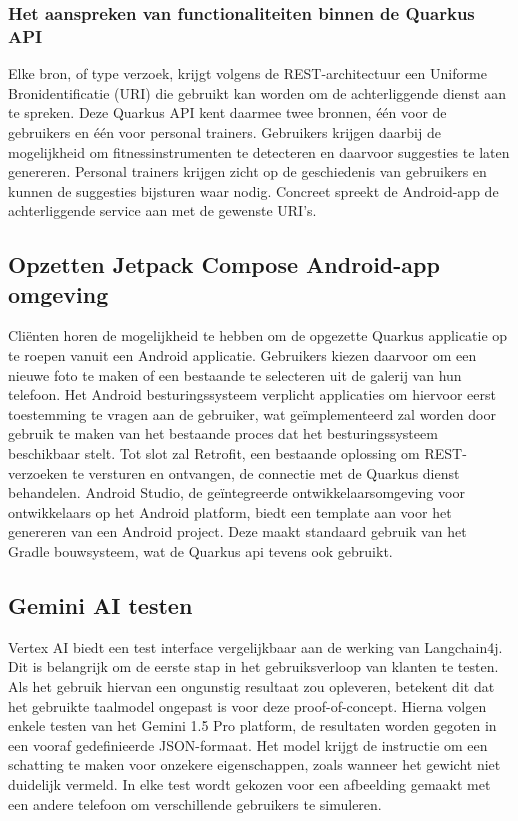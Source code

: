 \subsubsection{Het aanspreken van functionaliteiten binnen de Quarkus API}
Elke bron, of type verzoek, krijgt volgens de REST-architectuur een Uniforme Bronidentificatie (URI) die gebruikt kan worden om de achterliggende dienst aan te spreken.
Deze Quarkus API kent daarmee twee bronnen, één voor de gebruikers en één voor personal trainers.
Gebruikers krijgen daarbij de mogelijkheid om fitnessinstrumenten te detecteren en daarvoor suggesties te laten genereren.
Personal trainers krijgen zicht op de geschiedenis van gebruikers en kunnen de suggesties bijsturen waar nodig.
Concreet spreekt de Android-app de achterliggende service aan met de gewenste URI's.

\subsection{Opzetten Jetpack Compose Android-app omgeving}
\label{subsec:opzetten-jetpack-compose-android-app}
Cliënten horen de mogelijkheid te hebben om de opgezette Quarkus applicatie op te roepen vanuit een Android applicatie.
Gebruikers kiezen daarvoor om een nieuwe foto te maken of een bestaande te selecteren uit de galerij van hun telefoon.
Het Android besturingssysteem verplicht applicaties om hiervoor eerst toestemming te vragen aan de gebruiker, wat geïmplementeerd zal worden door gebruik te maken van het bestaande proces dat het besturingssysteem beschikbaar stelt.
Tot slot zal Retrofit, een bestaande oplossing om REST-verzoeken te versturen en ontvangen, de connectie met de Quarkus dienst behandelen.
Android Studio, de geïntegreerde ontwikkelaarsomgeving voor ontwikkelaars op het Android platform, biedt een template aan voor het genereren van een Android project.
Deze maakt standaard gebruik van het Gradle bouwsysteem, wat de Quarkus api tevens ook gebruikt.

\subsection{Gemini AI testen}
\label{subsec:gemini-ai-testen}
Vertex AI biedt een test interface vergelijkbaar aan de werking van Langchain4j.
Dit is belangrijk om de eerste stap in het gebruiksverloop van klanten te testen.
Als het gebruik hiervan een ongunstig resultaat zou opleveren, betekent dit dat het gebruikte taalmodel ongepast is voor deze proof-of-concept.
Hierna volgen enkele testen van het Gemini 1.5 Pro platform, de resultaten worden gegoten in een vooraf gedefinieerde JSON-formaat.
Het model krijgt de instructie om een schatting te maken voor onzekere eigenschappen, zoals wanneer het gewicht niet duidelijk vermeld.
In elke test wordt gekozen voor een afbeelding gemaakt met een andere telefoon om verschillende gebruikers te simuleren.

